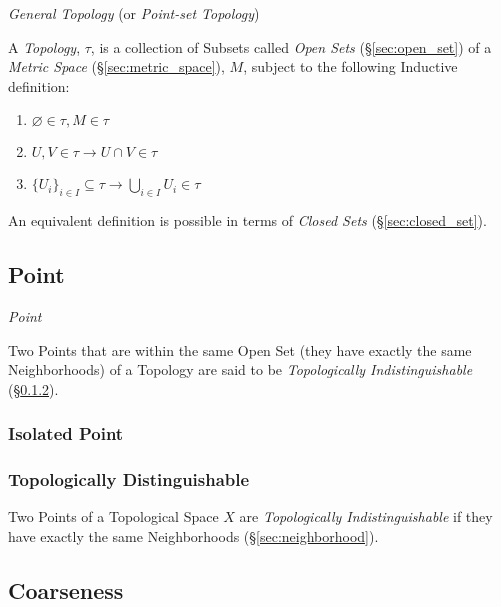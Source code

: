 \emph{General Topology} (or \emph{Point-set Topology})

A \emph{Topology}, $\tau$, is a collection of Subsets called
\emph{Open Sets} (\S\ref{sec:open_set}) of a \emph{Metric Space}
(\S\ref{sec:metric_space}), $M$, subject to the following Inductive
definition:
\begin{enumerate}
\item $\varnothing \in \tau, M \in \tau$
\item $U,V \in \tau \rightarrow U \cap V \in \tau$
\item $\{U_i\}_{i \in I} \subseteq \tau \rightarrow \bigcup_{i \in I}
  U_i \in \tau$
\end{enumerate}

An equivalent definition is possible in terms of \emph{Closed Sets}
(\S\ref{sec:closed_set}).



\subsection{Point}\label{sec:topological_point}

\emph{Point}

Two Points that are within the same Open Set (they have exactly the
same Neighborhoods) of a Topology are said to be \emph{Topologically
  Indistinguishable} (\S\ref{sec:topologically_distinguishable}).



\subsubsection{Isolated Point}\label{sec:isolated_point}

\subsubsection{Topologically Distinguishable}
\label{sec:topologically_distinguishable}

Two Points of a Topological Space $X$ are \emph{Topologically
  Indistinguishable} if they have exactly the same Neighborhoods
(\S\ref{sec:neighborhood}).



\subsection{Coarseness}\label{sec:coarseness}

